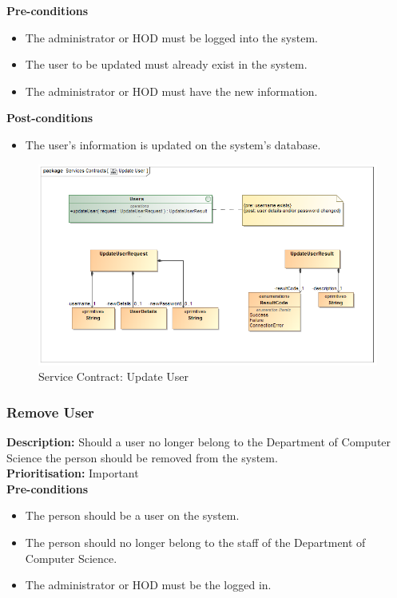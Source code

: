 \documentclass[a4paper]{article}
\begin{document}
    \textbf{Pre-conditions}
     \begin{itemize}
        \item The administrator or HOD must be logged into the system.
        \item The user to be updated must already exist in the system.
        \item The administrator or HOD must have the new information.
   \end{itemize}
    
    \textbf{Post-conditions}
    \begin{itemize}
        \item The user's information is updated on the system's database.
    \end{itemize}
    
        	\begin{figure}[H]
        		\centering
        		\includegraphics[width=\textwidth]{5.1.3.Update.User.Services.Contract.png}
        		\caption{Service Contract: Update User}
        	\end{figure}
    \pagebreak
    \subsubsection{Remove User}
    
    \textbf{Description:} Should a user no longer belong to the Department of Computer Science the person should be removed from the system.\\
    \textbf{Prioritisation:} Important\\
    
    \textbf{Pre-conditions}
     \begin{itemize}
        \item The person should be a user on the system.
        \item The person should no longer belong to the staff of the Department of Computer Science.
        \item The administrator or HOD must be the logged in.
   \end{itemize}
    
\end{document}
